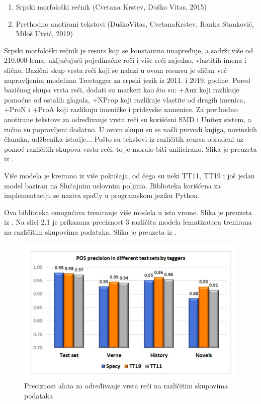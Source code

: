 \documentclass[12pt,oneside]{memoir}
\begin{document}
\begin{enumerate}
\item Srpski morfološki rečnik (Cvetana Krstev, Duško Vitas, 2015)
\item Prethodno anotirani tekstovi (DuškoVitas,  CvetanaKrstev,  Ranka Stanković,  Miloš Utvić,  2019)
\end{enumerate}

Srpski morfološki rečnik je resurs koji se konstantno unapređuje,  a sadrži više od 210.000 lema, uključujući pojedinačne reči i više reči zajedno,  vlastitih imena i slično.  Bazični skup vrsta reči koji se nalazi u ovom resursu je sličan već napravljenim modelima Treetagger za srpski jezik iz 2011. i 2019. godine.  Pored bazičnog skupa vrsta reči, dodati su markeri kao što su: +Aux koji razlikuje pomoćne od ostalih glagola, +NProp koji razlikuje vlastite od drugih imenica,  +ProN i +ProA koji razlikuju imeničke i pridevske zamenice. 
Za prethodno anotirane tekstove za određivanje vrsta reči su korišćeni SMD i Unitex sistem, a ručno su popravljeni dodatno.  U ovom skupu su se našli prevodi knjiga, novinskih članaka,  udžbenika istorije...  
Pošto su tekstovi iz različitih reursa obrađeni uz pomoć različitih skupova vrsta reči,  to je moralo biti unificirano. Slika je preuzeta iz \cite{tagger}.

Više modela je kreirano iz više pokušaja, od čega su neki TT11, TT19 i još jedan model baziran na Slučajnim uslovnim poljima.  Biblioteka korišćena za implementaciju se naziva spaCy u programskom jeziku Python. 

Ova biblioteka omogućava treniranje više modela u isto vreme.  Slika je preuzeta iz \cite{tagger}.
Na slici 2.1 je prikazana preciznost 3 različita modela lematizatora trenirana na različitim skupovima podataka.  Slika je preuzeta iz \cite{tagger}. 

\begin{figure}[h!]
\centering
\includegraphics[width=.7\textwidth]{images/pos_tagger.png}
\caption{Preciznost alata za određivanje vrsta reči na različitim skupovima podataka }
\label{Slika}
\end{figure}
\end{document}

